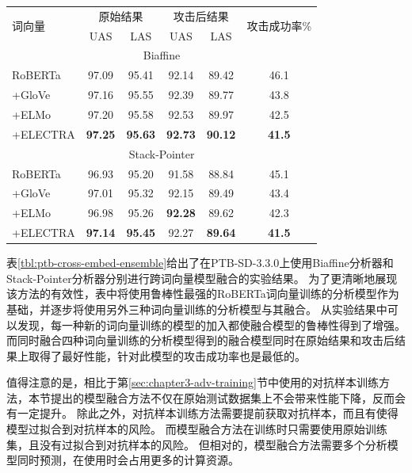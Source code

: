 \begin{table}[htbp]
    \vspace{0.5em}\centering\wuhao
	\begin{tabular}{lccccc}
		\toprule[1.5pt]
		\multirow{2}{*}{词向量}& \multicolumn{2}{c}{原始结果} & \multicolumn{2}{c}{攻击后结果} & \multirow{2}{*}{攻击成功率\%} \\
		\cmidrule(r){2-3} \cmidrule(r){4-5}
		& UAS & LAS & UAS & LAS & \\
		\midrule[1pt]
		\multicolumn{6}{c}{Biaffine} \\
		\hline
		RoBERTa        &97.09 & 95.41 &92.14 &89.42 &46.1 \\
		+GloVe     &97.16 & 95.55 &92.39 &89.77 &43.8 \\
		+ELMo   &97.20 & 95.58 &92.53 &89.97 &42.5 \\
		+ELECTRA &\bf97.25 &\bf95.63 &\bf92.73 &\bf90.12 &\bf41.5 \\
		\hline
		\multicolumn{6}{c}{Stack-Pointer} \\
		\hline
		RoBERTa        &96.93 & 95.20 &91.58 &88.84 &45.1 \\
		+GloVe     &97.01 & 95.32 &92.15 &89.49 &43.4 \\
		+ELMo   &96.98 & 95.26 &\bf 92.28 &89.62 &42.3 \\
		+ELECTRA &\bf 97.14 &\bf 95.45 &92.27 &\bf 89.64 &\bf 41.5 \\
		\bottomrule[1.5pt]
	\end{tabular}
\end{table}

表\ref{tbl:ptb-cross-embed-ensemble}给出了在PTB-SD-3.3.0上使用Biaffine分析器和Stack-Pointer分析器分别进行跨词向量模型融合的实验结果。
为了更清晰地展现该方法的有效性，表中将使用鲁棒性最强的RoBERTa词向量训练的分析模型作为基础，并逐步将使用另外三种词向量训练的分析模型与其融合。
从实验结果中可以发现，每一种新的词向量训练的模型的加入都使融合模型的鲁棒性得到了增强。
而同时融合四种词向量训练的分析模型得到的融合模型同时在原始结果和攻击后结果上取得了最好性能，针对此模型的攻击成功率也是最低的。

值得注意的是，相比于第\ref{sec:chapter3-adv-training}节中使用的对抗样本训练方法，本节提出的模型融合方法不仅在原始测试数据集上不会带来性能下降，反而会有一定提升。
除此之外，对抗样本训练方法需要提前获取对抗样本，而且有使得模型过拟合到对抗样本的风险。
而模型融合方法在训练时只需要使用原始训练集，且没有过拟合到对抗样本的风险。
但相对的，模型融合方法需要多个分析模型同时预测，在使用时会占用更多的计算资源。

